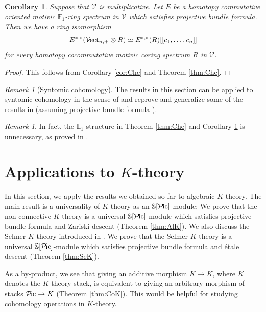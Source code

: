 \documentclass{amsart}
\theoremstyle{plain}
\newtheorem{corollary}[theorem]{Corollary}
\theoremstyle{definition}
\theoremstyle{remark}
\newtheorem{remark}[theorem]{Remark}
\numberwithin{equation}{theorem}
\newcommand{\mbb}[1]{\mathbb{#1}}
\newcommand{\V}{\mathcal{V}}
\newcommand{\Pic}{{\mathcal{P}\mspace{-2.0mu}\mathrm{ic}}}
\newcommand{\Vect}{{\mathcal{V}\mspace{-2.0mu}\mathrm{ect}}}
\begin{document}
\begin{corollary}\label{cor:Che2}
Suppose that $\V$ is multiplicative.
Let $E$ be a homotopy commutative oriented motivic $\mbb{E}_1$-ring spectrum in $\V$ which satisfies projective bundle formula.
Then we have a ring isomorphism
\[
	E^{*,*}(\Vect_{n,+}\otimes R) \simeq E^{*,*}(R)[[c_1,\dotsc,c_n]]
\]
for every homotopy cocommutative motivic coring spectrum $R$ in $\V$.
\end{corollary}
\begin{proof}
This follows from Corollary \ref{cor:Che} and Theorem \ref{thm:Che}.
\end{proof}

\begin{remark}[Syntomic cohomology]
The results in this section can be applied to syntomic cohomology in the sense of \cite{BL} and reprove and generalize some of the results in \cite[\S9]{BL} (assuming projective bundle formula \cite[Theorem 9.1.1]{BL}).
\end{remark}

\begin{remark}
In fact, the $\mbb{E}_1$-structure in Theorem \ref{thm:Che} and Corollary \ref{cor:Che2} is unnecessary, as proved in \cite{AHI}.
\end{remark}




\newpage

\section{Applications to $K$-theory}\label{MSn}

In this section, we apply the results we obtained so far to algebraic $K$-theory.
The main result is a universality of $K$-theory as an $\mbb{S}[\Pic]$-module: We prove that the non-connective $K$-theory is a universal $\mbb{S}[\Pic]$-module which satisfies projective bundle formula and Zariski descent (Theorem \ref{thm:AlK}).
We also discuss the Selmer $K$-theory introduced in \cite{Cla}.
We prove that the Selmer $K$-theory is a universal $\mbb{S}[\Pic]$-module which satisfies projective bundle formula and \'etale descent (Theorem \ref{thm:SeK}).

As a by-product, we see that giving an additive morphism $K\to K$, where $K$ denotes the $K$-theory stack, is equivalent to giving an arbitrary morphism of stacks $\Pic\to K$ (Theorem \ref{thm:CoK}).
This would be helpful for studying cohomology operations in $K$-theory.
\end{document}
